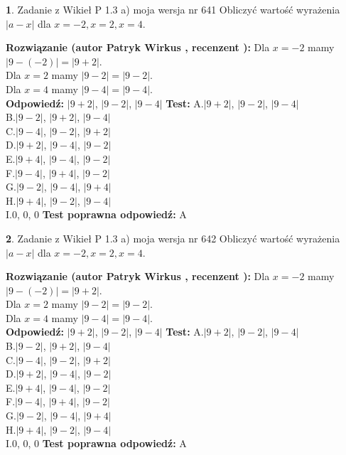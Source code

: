 \documentclass[12pt, a4paper]{article}
\theoremstyle{definition} %
\newtheorem{zad}{}
\newcommand{\zadStart}[1]{\begin{zad}#1\newline}
\newcommand{\zadStop}{\end{zad}}
\newcommand{\rozwStart}[2]{\noindent \textbf{Rozwiązanie (autor #1 , recenzent #2): }\newline}
\newcommand{\rozwStop}{\newline}
\newcommand{\odpStart}{\noindent \textbf{Odpowiedź:}\newline}
\newcommand{\odpStop}{\newline}
\newcommand{\testStart}{\noindent \textbf{Test:}\newline}
\newcommand{\testStop}{\newline}
\newcommand{\kluczStart}{\noindent \textbf{Test poprawna odpowiedź:}\newline}
\newcommand{\kluczStop}{\newline}
\begin{document}
\zadStart{Zadanie z Wikieł P 1.3 a) moja wersja nr 641}
Obliczyć wartość wyrażenia $|a - x|$ dla $x=-2,x=2,x=4$.
\zadStop
\rozwStart{Patryk Wirkus}{}
Dla $x = -2$ mamy $|9 - (-2)| = |9 + 2|$.\\
Dla $x = 2$ mamy $|9 - 2| = |9 - 2|$.\\
Dla $x = 4$ mamy $|9 - 4| = |9 - 4|$.\\
\rozwStop
\odpStart
$|9 + 2|$, $|9 - 2|$, $|9 - 4|$
\odpStop
\testStart
A.$|9 + 2|$, $|9 - 2|$, $|9 - 4|$\\
B.$|9 - 2|$, $|9 + 2|$, $|9 - 4|$\\
C.$|9 - 4|$, $|9 - 2|$, $|9 + 2|$\\
D.$|9 + 2|$, $|9 - 4|$, $|9 - 2|$\\
E.$|9 + 4|$, $|9 - 4|$, $|9 - 2|$\\
F.$|9 - 4|$, $|9 + 4|$, $|9 - 2|$\\
G.$|9 - 2|$, $|9 - 4|$, $|9 + 4|$\\
H.$|9 + 4|$, $|9 - 2|$, $|9 - 4|$\\
I.$0$, $0$, $0$
\testStop
\kluczStart
A
\kluczStop



\zadStart{Zadanie z Wikieł P 1.3 a) moja wersja nr 642}
Obliczyć wartość wyrażenia $|a - x|$ dla $x=-2,x=2,x=4$.
\zadStop
\rozwStart{Patryk Wirkus}{}
Dla $x = -2$ mamy $|9 - (-2)| = |9 + 2|$.\\
Dla $x = 2$ mamy $|9 - 2| = |9 - 2|$.\\
Dla $x = 4$ mamy $|9 - 4| = |9 - 4|$.\\
\rozwStop
\odpStart
$|9 + 2|$, $|9 - 2|$, $|9 - 4|$
\odpStop
\testStart
A.$|9 + 2|$, $|9 - 2|$, $|9 - 4|$\\
B.$|9 - 2|$, $|9 + 2|$, $|9 - 4|$\\
C.$|9 - 4|$, $|9 - 2|$, $|9 + 2|$\\
D.$|9 + 2|$, $|9 - 4|$, $|9 - 2|$\\
E.$|9 + 4|$, $|9 - 4|$, $|9 - 2|$\\
F.$|9 - 4|$, $|9 + 4|$, $|9 - 2|$\\
G.$|9 - 2|$, $|9 - 4|$, $|9 + 4|$\\
H.$|9 + 4|$, $|9 - 2|$, $|9 - 4|$\\
I.$0$, $0$, $0$
\testStop
\kluczStart
A
\kluczStop
\end{document}
